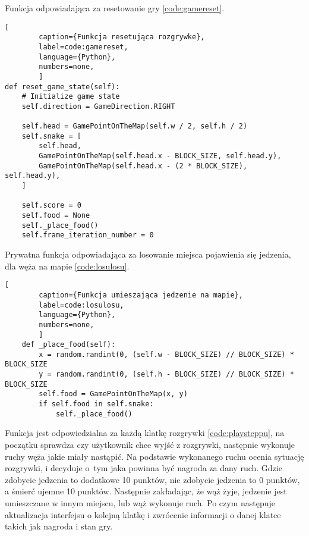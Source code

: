 \clearpage

Funkcja odpowiadająca za resetowanie gry \ref{code:gamereset}.

\begin{onepage}
    \begin{lstlisting}[
        caption={Funkcja resetująca rozgrywke},
        label=code:gamereset,
        language={Python},
        numbers=none,
        ]
def reset_game_state(self):
    # Initialize game state
    self.direction = GameDirection.RIGHT

    self.head = GamePointOnTheMap(self.w / 2, self.h / 2)
    self.snake = [
        self.head,
        GamePointOnTheMap(self.head.x - BLOCK_SIZE, self.head.y),
        GamePointOnTheMap(self.head.x - (2 * BLOCK_SIZE), self.head.y),
    ]

    self.score = 0
    self.food = None
    self._place_food()
    self.frame_iteration_number = 0
    \end{lstlisting}
\end{onepage}


Prywatna funkcja odpowiadająca za losowanie miejsca pojawienia się jedzenia, dla węża na mapie \ref{code:losulosu}.

\begin{onepage}
    \begin{lstlisting}[
        caption={Funkcja umieszająca jedzenie na mapie},
        label=code:losulosu,
        language={Python},
        numbers=none,
        ]
    def _place_food(self):
        x = random.randint(0, (self.w - BLOCK_SIZE) // BLOCK_SIZE) * BLOCK_SIZE
        y = random.randint(0, (self.h - BLOCK_SIZE) // BLOCK_SIZE) * BLOCK_SIZE
        self.food = GamePointOnTheMap(x, y)
        if self.food in self.snake:
            self._place_food()
    \end{lstlisting}
\end{onepage}

\clearpage

Funkcja  jest odpowiedzialna za każdą klatkę rozgrywki \ref{code:playsteppu}, na początku sprawdza czy użytkownik chce wyjść z rozgrywki, następnie wykonuje ruchy węża jakie miały nastąpić. Na podstawie wykonanego ruchu ocenia sytuację rozgrywki, i decyduje o~tym jaka powinna być nagroda za dany ruch. Gdzie zdobycie jedzenia to dodatkowe 10 punktów, nie zdobycie jedzenia to 0 punktów, a śmierć ujemne 10 punktów. Następnie zakładając, że wąż żyje, jedzenie jest umieszczane w innym miejscu, lub wąż wykonuje ruch. Po czym następuje aktualizacja interfejsu o kolejną klatkę i zwrócenie informacji o danej klatce takich jak nagroda i stan gry.

